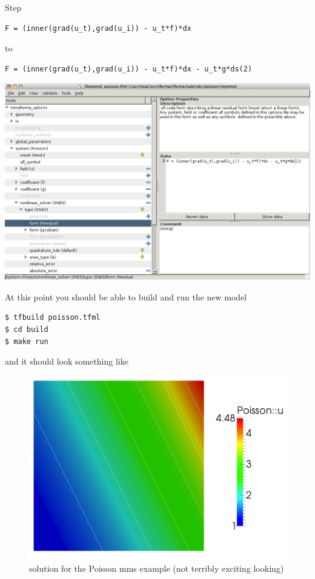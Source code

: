 \begin{steps}{Step}
  \begin{lstlisting}[style=UFL]
    F = (inner(grad(u_t),grad(u_i)) - u_t*f)*dx
  \end{lstlisting}
to
  \begin{lstlisting}[style=UFL]
    F = (inner(grad(u_t),grad(u_i)) - u_t*f)*dx - u_t*g*ds(2)
  \end{lstlisting}
\begin{center}
\includegraphics[width=\diamondwidth]{figures/screendumps/diamond_poisson_mms_residual.png}
  \end{center}
\item At this point you should be able to build and run the new model
  \begin{lstlisting}[style=Bash]
$ tfbuild poisson.tfml
$ cd build
$ make run
   \end{lstlisting} %
and it should look something like
\begin{figure}[h]
  \centering
  \includegraphics[width=.7\textwidth]{figures/poisson_mms.png}
  \caption{solution for the Poisson mms example (not terribly exciting looking)}
  \label{fig:poisson_mms}
\end{figure}

\end{steps}


